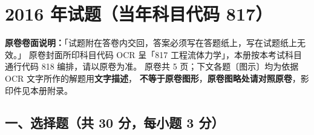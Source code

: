 \chapter{2016 年试题（当年科目代码 817）}

\begin{tishi}
\textbf{原卷卷面说明：}「试题附在答卷内交回，答案必须写在答题纸上，写在试题纸上无效。」
原卷封面所印科目代码 OCR 呈「817 工程流体力学」，本册按本考试科目通行代码 818 编排，请以原卷为准。
原卷共 5 页；下文各题〔图示〕均为依据 OCR 文字所作的解题用\textbf{文字描述}，
\textbf{不等于原卷图形}，\textbf{原卷图略处请对照原卷}，影印件见本册附录。
\end{tishi}

\section{一、选择题（共 30 分，每小题 3 分）}

